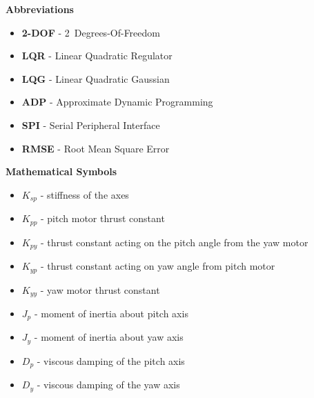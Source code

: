 
\renewcommand{\nomname}{Nomenclature}
\renewcommand{\nomAname}{\textbf{\large Abbreviations}}
\renewcommand{\nomGname}{\textbf{\large Mathematical Symbols}}
\renewcommand{\nomXname}{\textbf{\large Superscripts}}
\renewcommand{\nomZname}{\textbf{\large Subscripts}}

\printnomenclature
\cleardoublepage
{} %


\nomAname
\bigbreak
\begin{itemize}
    \item[]\textbf{2-DOF} - 2~Degrees-Of-Freedom
    \item[]\textbf{LQR} - Linear Quadratic Regulator
    \item[] \textbf{LQG} - Linear Quadratic Gaussian
    \item[]\textbf{ADP} - Approximate Dynamic Programming
    \item[]\textbf{SPI} - Serial Peripheral Interface
    \item[]\textbf{RMSE} - Root Mean Square Error
\end{itemize}

\nomGname
\bigbreak
\begin{itemize}
    \item[]$K_{sp}$ - stiffness of the axes
    \item[]$K_{pp}$ - pitch motor thrust constant
    \item[]$K_{py}$ - thrust constant acting on the pitch angle from the yaw motor
    \item[]$K_{yp}$ - thrust constant acting on yaw angle from pitch motor
    \item[]$K_{yy}$ - yaw motor thrust constant
    \item[]$J_p$ - moment of inertia about pitch axis
    \item[]$J_y$ - moment of inertia about yaw axis
    \item[]$D_p$ - viscous damping of the pitch axis
    \item[]$D_y$ - viscous damping of the yaw axis
\end{itemize}


